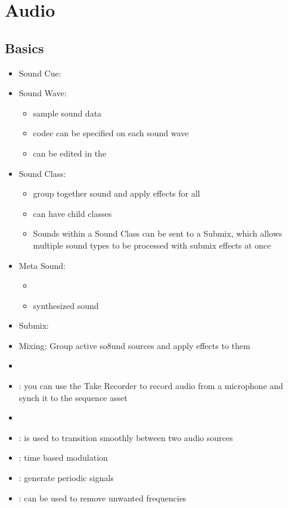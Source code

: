 \chapter{Audio}
    \section{Basics}
        \begin{itemize}
            \item Sound Cue:
            \item Sound Wave:
            \begin{itemize}
                \item sample sound data
                \item codec can be specified on each sound wave
                \item can be edited in the 
            \end{itemize}
            \item Sound Class:
            \begin{itemize}
                \item group together sound and apply effects for all
                \item can have child classes
                \item Sounds within a Sound Class can be sent to a Submix, which allows multiple sound types to be processed with submix effects at once
            \end{itemize}
            \item Meta Sound:
            \begin{itemize}
                \item 
                \item synthesized sound
            \end{itemize}
            
            \item Submix: 
            \item Mixing: Group active so8und sources and apply effects to them
            \item 
            \item {}: you can use the Take Recorder to record audio from a microphone and synch it to the sequence asset
            \item 
            \item {}: is used to transition smoothly between two audio sources
            \item {}: time based modulation
            \item {}: generate periodic signals
            \item {}: can be used to remove unwanted frequencies
        \end{itemize}


